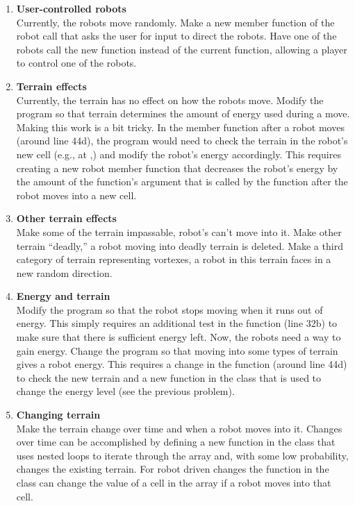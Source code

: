 \begin{enumerate}[{\bf 1.}]
\item {\bf User-controlled robots}\\ 
Currently, the robots move randomly.  Make a new member function of the robot call that asks the user for input to direct the robots.  Have one of the robots call the new function instead of the current  function, allowing a player to control one of the robots.%

\item {\bf Terrain effects}\\
 Currently, the terrain has no effect on how the robots move.  Modify the program so that terrain determines the amount of energy used during a move.  Making this work is a bit tricky.  In the  member function after a robot moves (around line 44d), the program would need to check the terrain in the robot's new cell (e.g., at ,) and modify the robot's energy accordingly.  This requires creating a new robot member function that decreases the robot's energy by the amount of the function's argument that is called by the  function after the robot moves into a new cell.

\item {\bf Other terrain effects}\\
Make some of the terrain impassable, robot's can't move into it.  Make other terrain ``deadly,'' a robot moving into deadly terrain is deleted.  Make a third category of terrain representing vortexes, a robot in this terrain faces in a new random direction.

\item {\bf Energy and terrain}\\ 
Modify the program so that the robot stops moving when it runs out of energy.  This simply requires an additional test in the  function (line 32b) to make sure that there is sufficient energy left. Now, the robots need a way to gain energy.  Change the program so that moving into some types of terrain gives a robot energy.  This requires a change in the  function (around line 44d) to check the new terrain and a new function in the  class that is used to change the energy level (see the previous problem).

\item {\bf Changing terrain}\\
 Make the terrain change over time and when a robot moves into it.   Changes over time can be accomplished by defining a new function in the  class that uses nested loops to iterate through the  array and, with some low probability, changes the existing terrain.
For robot driven changes  the  function in the  class can change the value of a cell in the  array if a robot moves into that cell.  


\end{enumerate}
